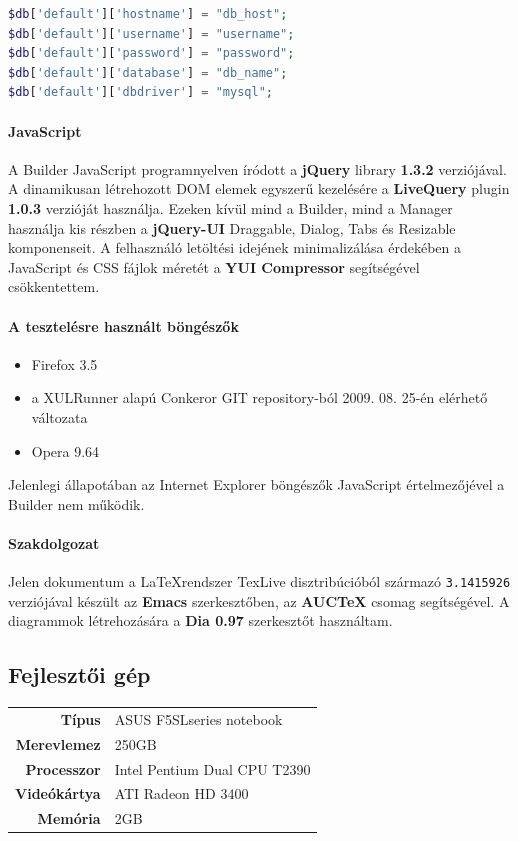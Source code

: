 \documentclass[12pt,a4paper,twoside]{article}
\begin{document}
\begin{lstlisting}[language=PHP, firstnumber=40]
$db['default']['hostname'] = "db_host";
$db['default']['username'] = "username";
$db['default']['password'] = "password";
$db['default']['database'] = "db_name";
$db['default']['dbdriver'] = "mysql";
\end{lstlisting}

\paragraph{JavaScript}
A Builder JavaScript programnyelven íródott a \textbf{jQuery}\cite{JQ} library
\textbf{1.3.2} verziójával. A dinamikusan létrehozott DOM elemek egyszerű
kezelésére a \textbf{LiveQuery}\cite{JQ-LiveQuery} plugin \textbf{1.0.3}
verzióját használja. Ezeken kívül mind a Builder, mind a Manager használja
kis részben a \textbf{jQuery-UI}\cite{JQ-UI} Draggable, Dialog, Tabs és
Resizable komponenseit. A felhasználó letöltési idejének minimalizálása
érdekében a JavaScript és CSS fájlok méretét a \textbf{YUI Compressor}\cite{YUI}
segítségével csökkentettem.

\paragraph{A tesztelésre használt böngészők}
\begin{itemize}
\item Firefox 3.5
\item a XULRunner alapú Conkeror GIT repository-ból 2009. 08. 25-én elérhető változata
\item Opera 9.64
\end{itemize}
Jelenlegi állapotában az Internet Explorer böngészők JavaScript
értelmezőjével a Builder nem működik.

\paragraph{Szakdolgozat}
Jelen dokumentum a \LaTeX  rendszer TexLive disztribúcióból származó
\texttt{3.1415926} verziójával készült az \textbf{Emacs} szerkesztőben, az
\textbf{AUCTeX} csomag segítségével. A diagrammok létrehozására a \textbf{Dia 0.97}
szerkesztőt használtam.

\subsection{Fejlesztői gép}
\begin{tabular*}{\textwidth}{>{\bf}r|l}
  Típus       & ASUS F5SLseries notebook\\
  Merevlemez  & 250GB\\
  Processzor  & Intel Pentium Dual CPU T2390\\
  Videókártya & ATI Radeon HD 3400\\
  Memória     & 2GB\\
\end{tabular*}
\end{document}
